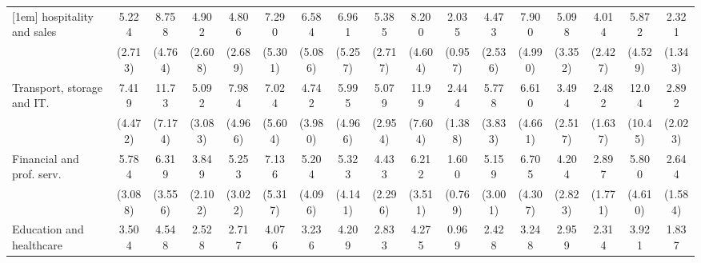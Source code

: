 {\begin{tabular}{l*{16}{c}}
[1em]
hospitality and sales&       5.224\sym{**} &       8.758\sym{***}&       4.902\sym{**} &       4.806\sym{**} &       7.290\sym{**} &       6.584\sym{*}  &       6.961\sym{*}  &       5.385\sym{***}&       8.200\sym{***}&       2.035         &       4.473\sym{**} &       7.900\sym{**} &       5.098\sym{*}  &       4.014\sym{*}  &       5.872\sym{*}  &       2.321         \\
                    &     (2.713)         &     (4.764)         &     (2.608)         &     (2.689)         &     (5.301)         &     (5.086)         &     (5.257)         &     (2.717)         &     (4.604)         &     (0.957)         &     (2.536)         &     (4.990)         &     (3.352)         &     (2.427)         &     (4.529)         &     (1.343)         \\
[1em]
Transport, storage and IT.&       7.419\sym{***}&       11.73\sym{***}&       5.092\sym{**} &       7.984\sym{***}&       7.024\sym{*}  &       4.742         &       5.995\sym{*}  &       5.079\sym{**} &       11.99\sym{***}&       2.444         &       5.778\sym{**} &       6.610\sym{**} &       3.494         &       2.482         &       12.04\sym{**} &       2.892         \\
                    &     (4.472)         &     (7.174)         &     (3.083)         &     (4.966)         &     (5.604)         &     (3.980)         &     (4.966)         &     (2.954)         &     (7.604)         &     (1.388)         &     (3.833)         &     (4.661)         &     (2.517)         &     (1.637)         &     (10.45)         &     (2.023)         \\
[1em]
Financial and prof. serv.&       5.784\sym{**} &       6.319\sym{**} &       3.849\sym{*}  &       5.253\sym{**} &       7.136\sym{**} &       5.204\sym{*}  &       5.323\sym{*}  &       4.433\sym{**} &       6.212\sym{**} &       1.600         &       5.159\sym{**} &       6.705\sym{**} &       4.204\sym{*}  &       2.897         &       5.800\sym{*}  &       2.644         \\
                    &     (3.088)         &     (3.556)         &     (2.102)         &     (3.022)         &     (5.317)         &     (4.096)         &     (4.141)         &     (2.296)         &     (3.511)         &     (0.769)         &     (3.001)         &     (4.307)         &     (2.823)         &     (1.771)         &     (4.610)         &     (1.584)         \\
[1em]
Education and healthcare&       3.504\sym{*}  &       4.548\sym{**} &       2.528         &       2.717         &       4.076         &       3.236         &       4.209         &       2.833\sym{*}  &       4.275\sym{*}  &       0.969         &       2.428         &       3.248         &       2.959         &       2.314         &       3.921         &       1.837         \\

\end{tabular}}
